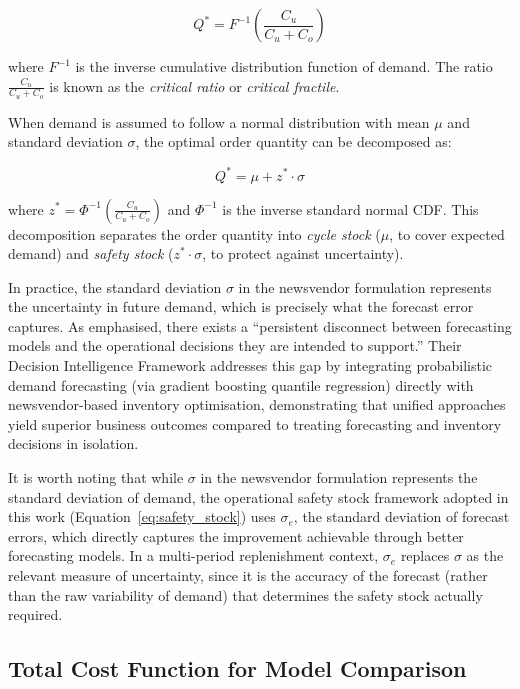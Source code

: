 \documentclass[ENG]{TFUOC}%
\begin{document}
\begin{equation}
Q^* = F^{-1}\left(\frac{C_u}{C_u + C_o}\right)
\label{eq:newsvendor}
\end{equation}

\noindent where $F^{-1}$ is the inverse cumulative distribution function of demand. The ratio $\frac{C_u}{C_u + C_o}$ is known as the \textit{critical ratio} or \textit{critical fractile}.

When demand is assumed to follow a normal distribution with mean $\mu$ and standard deviation $\sigma$, the optimal order quantity can be decomposed as:

\begin{equation}
Q^* = \mu + z^* \cdot \sigma
\label{eq:newsvendor_normal}
\end{equation}

\noindent where $z^* = \Phi^{-1}\left(\frac{C_u}{C_u + C_o}\right)$ and $\Phi^{-1}$ is the inverse standard normal CDF. This decomposition separates the order quantity into \textit{cycle stock} ($\mu$, to cover expected demand) and \textit{safety stock} ($z^* \cdot \sigma$, to protect against uncertainty).

In practice, the standard deviation $\sigma$ in the newsvendor formulation represents the uncertainty in future demand, which is precisely what the forecast error captures. As \citet{ngartera2026stochastic} emphasised, there exists a ``persistent disconnect between forecasting models and the operational decisions they are intended to support.'' Their Decision Intelligence Framework addresses this gap by integrating probabilistic demand forecasting (via gradient boosting quantile regression) directly with newsvendor-based inventory optimisation, demonstrating that unified approaches yield superior business outcomes compared to treating forecasting and inventory decisions in isolation.

It is worth noting that while $\sigma$ in the newsvendor formulation 
represents the standard deviation of demand, the operational safety 
stock framework adopted in this work (Equation~\ref{eq:safety_stock}) 
uses $\sigma_e$, the standard deviation of forecast errors, which 
directly captures the improvement achievable through better forecasting 
models. In a multi-period replenishment context, $\sigma_e$ replaces 
$\sigma$ as the relevant measure of uncertainty, since it is the 
accuracy of the forecast (rather than the raw variability of demand) that determines the safety stock actually required.

\subsection{Total Cost Function for Model Comparison}
\end{document}

